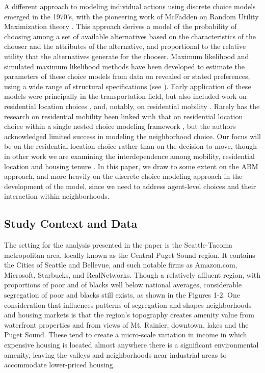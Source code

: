 \documentclass[12pt,a4paper]{article}
\begin{document}
A different approach to modeling individual actions using discrete
choice models emerged in the 1970's, with the pioneering work of
McFadden on Random Utility Maximization theory
\cite{mcfadden-1974,mcfadden-1981}. This approach derives a model of
the probability of choosing among a set of available alternatives
based on the characteristics of the chooser and the attributes of
the alternative, and proportional to the relative utility that the
alternatives generate for the chooser. Maximum likelihood and
simulated maximum likelihood methods have been developed to estimate
the parameters of these choice models from data on revealed or
stated preferences, using a wide range of structural specifications
(see \cite{train-book-2003}). Early application of these models were
principally in the transportation field, but also included work on
residential location choices
\cite{quigley-eer-1976,lerman-trr-1977,mcfadden-1978}, and, notably,
on residential mobility \cite{clark-vanlierop-1986}.  Rarely has the
research on residential mobility been linked with that on residential
location choice within a single nested choice modeling framework 
\cite{clark-onaka-1985}, but the authors acknowledged limited success 
in modeling the neighborhood choice.  Our focus will be
on the residential location choice rather than on the decision to move,
though in other work we are examining the interdependence
among mobility, residential location and housing tenure \cite{waddell-book-2007}.
In this paper, we draw to some extent on the ABM approach, and more heavily on the
discrete choice modeling approach in the development of the model,
since we need to address agent-level choices and their interaction
within neighborhoods.

\subsection{Study Context and Data}
The setting for the analysis presented in the paper is the
Seattle-Tacoma metropolitan area, locally known as the Central Puget
Sound region.  It contains the Cities of Seattle and Bellevue, and
such notable firms as Amazon.com, Microsoft, Starbucks, and
RealNetworks.  Though a relatively affluent region, with proportions
of poor and of blacks well below national averages, considerable
segregation of poor and blacks still exists, as shown in the Figures
1-2.  One consideration that influences patterns of segregation and
shapes neighborhoods and housing markets is that the region's
topography creates amenity value from waterfront properties and from
views of Mt. Rainier, downtown, lakes and the Puget Sound. These
tend to create a micro-scale variation in income in which expensive
housing is located almost anywhere there is a significant
environmental amenity, leaving the valleys and neighborhoods near
industrial areas to accommodate lower-priced housing.
\end{document}
